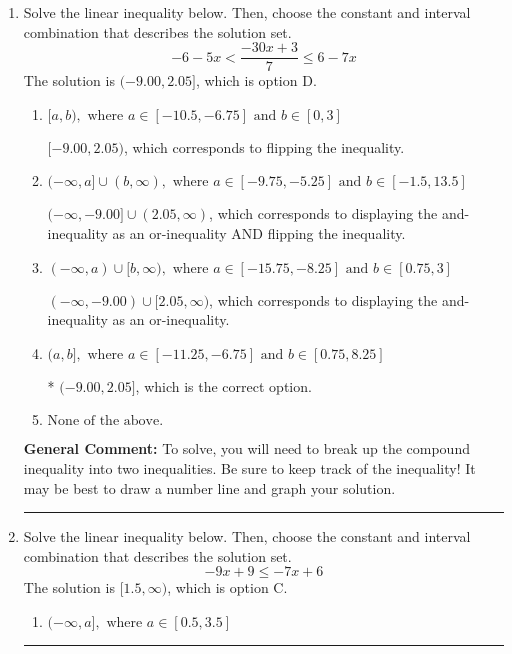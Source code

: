 \documentclass{extbook}[14pt]
\newcommand{\litem}[1]{\item #1

\rule{\textwidth}{0.4pt}}
\begin{document}
\begin{enumerate}
{\begin{enumerate}[label=\Alph*.]
* $(-\infty, 1.0]$, which is the correct option.
\item \( \text{None of the above}. \)

You may have chosen this if you thought the inequality did not match the ends of the intervals.
\end{enumerate}

\textbf{General Comment:} Remember that less/greater than or equal to includes the endpoint, while less/greater do not. Also, remember that you need to flip the inequality when you multiply or divide by a negative.
}
\litem{
Solve the linear inequality below. Then, choose the constant and interval combination that describes the solution set.
\[ -6 - 5 x < \frac{-30 x + 3}{7} \leq 6 - 7 x \]The solution is \( (-9.00, 2.05] \), which is option D.\begin{enumerate}[label=\Alph*.]
\item \( [a, b), \text{ where } a \in [-10.5, -6.75] \text{ and } b \in [0, 3] \)

$[-9.00, 2.05)$, which corresponds to flipping the inequality.
\item \( (-\infty, a] \cup (b, \infty), \text{ where } a \in [-9.75, -5.25] \text{ and } b \in [-1.5, 13.5] \)

$(-\infty, -9.00] \cup (2.05, \infty)$, which corresponds to displaying the and-inequality as an or-inequality AND flipping the inequality.
\item \( (-\infty, a) \cup [b, \infty), \text{ where } a \in [-15.75, -8.25] \text{ and } b \in [0.75, 3] \)

$(-\infty, -9.00) \cup [2.05, \infty)$, which corresponds to displaying the and-inequality as an or-inequality.
\item \( (a, b], \text{ where } a \in [-11.25, -6.75] \text{ and } b \in [0.75, 8.25] \)

* $(-9.00, 2.05]$, which is the correct option.
\item \( \text{None of the above.} \)


\end{enumerate}

\textbf{General Comment:} To solve, you will need to break up the compound inequality into two inequalities. Be sure to keep track of the inequality! It may be best to draw a number line and graph your solution.
}
\litem{
Solve the linear inequality below. Then, choose the constant and interval combination that describes the solution set.
\[ -9x + 9 \leq -7x + 6 \]The solution is \( [1.5, \infty) \), which is option C.\begin{enumerate}[label=\Alph*.]
\item \( (-\infty, a], \text{ where } a \in [0.5, 3.5] \)


\end{enumerate}}
\end{enumerate}
\end{document}
